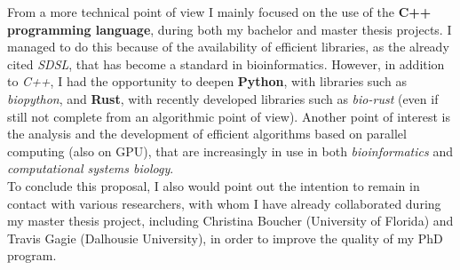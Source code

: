 \documentclass[a4paper,11pt, oneside]{article}
\begin{document}
From a more technical point of view I mainly focused on the use of the
\textbf{C++ programming language}, during both my bachelor and master
thesis projects. I managed to do this because of the availability of efficient
libraries, as the already 
cited \textit{SDSL}, that has become a standard in bioinformatics. However, in
addition to \textit{C++}, I had the opportunity to deepen 
\textbf{Python}, with libraries such as \textit{biopython}, and \textbf{Rust},
with recently developed libraries such as \textit{bio-rust} (even if still not
complete from an algorithmic point of view). Another point of interest is the
analysis and the development of efficient algorithms based on parallel computing
(also on GPU), that are increasingly in use in both \textit{bioinformatics} and
\textit{computational systems biology}. \\  
To conclude this proposal, I also would point out the intention to remain in
contact with various researchers, with whom I have already collaborated during 
my master thesis project, including Christina Boucher (University of Florida)
and Travis Gagie (Dalhousie University), in order to improve the quality of my
PhD program.
\vspace{-4mm}


\end{document}
